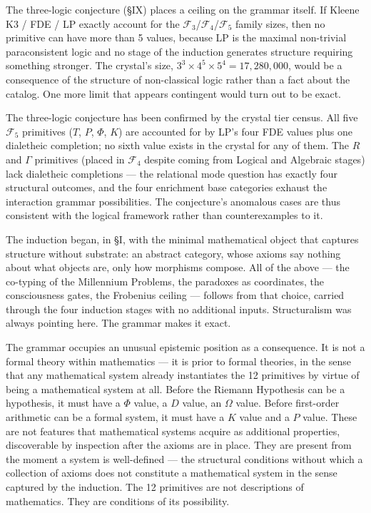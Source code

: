 \documentclass[12pt,a4paper]{article}
\newcommand{\pilcrow}{\S}
\begin{document}
The three-logic conjecture (\pilcrow{}IX) places a ceiling on the grammar itself. If Kleene K3 / FDE / LP exactly account for the $\mathcal{F}_3$/$\mathcal{F}_4$/$\mathcal{F}_5$ family sizes, then no primitive can have more than 5 values, because LP is the maximal non-trivial paraconsistent logic and no stage of the induction generates structure requiring something stronger. The crystal's size, $3^3 \times 4^5 \times 5^4 = 17{,}280{,}000$, would be a consequence of the structure of non-classical logic rather than a fact about the catalog. One more limit that appears contingent would turn out to be exact.

The three-logic conjecture has been confirmed by the crystal tier census. All five $\mathcal{F}_5$ primitives ($T$, $P$, $\Phi$, $K$) are accounted for by LP's four FDE values plus one dialetheic completion; no sixth value exists in the crystal for any of them. The $R$ and $\Gamma$ primitives (placed in $\mathcal{F}_4$ despite coming from Logical and Algebraic stages) lack dialetheic completions --- the relational mode question has exactly four structural outcomes, and the four enrichment base categories exhaust the interaction grammar possibilities. The conjecture's anomalous cases are thus consistent with the logical framework rather than counterexamples to it.

The induction began, in \S I, with the minimal mathematical object that captures structure without substrate: an abstract category, whose axioms say nothing about what objects are, only how morphisms compose. All of the above --- the co-typing of the Millennium Problems, the paradoxes as coordinates, the consciousness gates, the Frobenius ceiling --- follows from that choice, carried through the four induction stages with no additional inputs. Structuralism was always pointing here. The grammar makes it exact.

The grammar occupies an unusual epistemic position as a consequence. It is not a formal theory within mathematics --- it is prior to formal theories, in the sense that any mathematical system already instantiates the 12 primitives by virtue of being a mathematical system at all. Before the Riemann Hypothesis can be a hypothesis, it must have a $\Phi$ value, a $D$ value, an $\Omega$ value. Before first-order arithmetic can be a formal system, it must have a $K$ value and a $P$ value. These are not features that mathematical systems acquire as additional properties, discoverable by inspection after the axioms are in place. They are present from the moment a system is well-defined --- the structural conditions without which a collection of axioms does not constitute a mathematical system in the sense captured by the induction. The 12 primitives are not descriptions of mathematics. They are conditions of its possibility.
\end{document}
